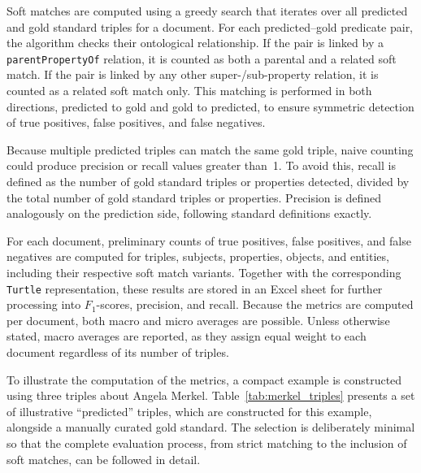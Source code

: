 \documentclass[a4paper,oneside,bibliography=totoc]{scrbook}
\begin{document}
Soft matches are computed using a greedy search that iterates over all predicted and gold standard triples for a document. For each predicted–gold predicate pair, the algorithm checks their ontological relationship. If the pair is linked by a \texttt{parentPropertyOf} relation, it is counted as both a parental and a related soft match. If the pair is linked by any other super-/sub-property relation, it is counted as a related soft match only. This matching is performed in both directions, predicted to gold and gold to predicted, to ensure symmetric detection of true positives, false positives, and false negatives.

Because multiple predicted triples can match the same gold triple, naive counting could produce precision or recall values greater than~1. To avoid this, recall is defined as the number of gold standard triples or properties detected, divided by the total number of gold standard triples or properties. Precision is defined analogously on the prediction side, following standard definitions exactly.

For each document, preliminary counts of true positives, false positives, and false negatives are computed for triples, subjects, properties, objects, and entities, including their respective soft match variants. Together with the corresponding \texttt{Turtle} representation, these results are stored in an Excel sheet for further processing into $F_1$-scores, precision, and recall. Because the metrics are computed per document, both macro and micro averages are possible. Unless otherwise stated, macro averages are reported, as they assign equal weight to each document regardless of its number of triples.

To illustrate the computation of the metrics, a compact example is constructed using three triples about Angela Merkel. Table~\ref{tab:merkel_triples} presents a set of illustrative \enquote{predicted} triples, which are constructed for this example, alongside a manually curated gold standard. The selection is deliberately minimal so that the complete evaluation process, from strict matching to the inclusion of soft matches, can be followed in detail.
\end{document}
